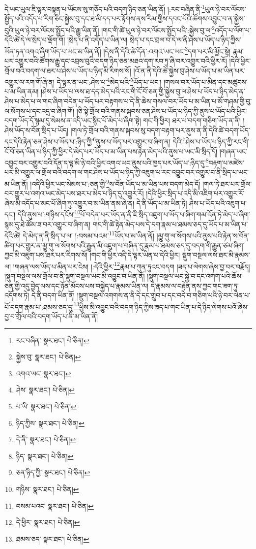 དེ་ཡང་ཡུལ་ཇི་ལྟར་བསྟན་པ་ཡོངས་སུ་གཅོད་པའི་བདག་ཉིད་ཅན་ཡིན་ནོ། །:རང་བཞིན་ནི་\footnote{རང་བཞིན་  སྣར་ཐང་།  པེ་ཅིན། }ཡུལ་ཉེ་བར་ལོངས་སྤྱོད་པའི་འདོད་པ་རིག་ཅིང་སྐྱེས་བུ་དང་ཐ་མི་དད་པར་རྟོགས་ནས་རིམ་གྱིས་དབང་པོའི་ཚོགས་འབྱུང་བ་ན་སྐྱེས་བུའི་ཡུལ་ཉེ་བར་ལོངས་སྤྱོད་པའི་རྒྱུ་ཡིན་ནོ། །གང་གི་ཚེ་ཡུལ་ཉེ་བར་ལོངས་སྤྱོད་པའི་:སྐྱེས་བུ་ལ་\footnote{སྐྱེས་བུ་  སྣར་ཐང་།  པེ་ཅིན། }འདོད་པ་ལོག་པ་དེའི་ཚེ་དེ་ལ་སྲེད་པ་ལྡོག་གོ། །སྲེད་པ་ནི་འདོད་པ་ཡིན་ལ། སྲེད་པ་དང་བྲལ་བ་དེ་ལ་ནི་ཤེས་པ་ཡོད་པ་ཉིད་ཀྱིས་ཡོན་ཏན་འགའ་ཞིག་ཡོད་པ་ཡང་མ་ཡིན་ནོ། །དེས་ནི་དེའི་ཚེ་དོན་:འགའ་ཡང་ཡང་\footnote{འགའ་ཡང་  སྣར་ཐང་། }དག་པར་མི་མྱོང་སྟེ། རྣམ་པར་འགྱུར་བའི་ཚོགས་རྒྱུ་དང་འབྲས་བུའི་བདག་ཉིད་ཅན་མཐའ་དག་རབ་ཏུ་ཞི་བར་འགྱུར་བའི་ཕྱིར་རོ། །དེའི་ཕྱིར་གྲོལ་བའི་བདག་ལ་ཐར་པ་ཤེས་པ་ཡོད་པ་ཉིད་མི་རིགས་སོ། །འོ་ན་ནི་དེའི་ཚེ་སྐྱེས་བུ་ཤེས་པ་ཡོད་པ་མ་ཡིན་པར་འགྱུར་ལ་རག་གོ་ཞེ་ན། དེ་ལྟར་ན་ཡང་:ཤེས་པ་\footnote{ཤེས་  སྣར་ཐང་།  པེ་ཅིན། }མེད་པའི་\footnote{པ་ཡི་  སྣར་ཐང་།  པེ་ཅིན། }ཡོད་པ་ཡང་། །གསལ་བར་ཡོད་པ་མིན་དང་མཚུངས་པ་མ་ཡིན་ནམ། །ཤེས་པ་ཡོད་པ་ལས་ཐ་དད་མེད་པའི་རང་གི་ངོ་བོ་ཅན་གྱི་སྐྱེས་བུ་ལ་ཤེས་པ་ཡོད་པ་ཉིད་མེད་ན་ཤེས་པ་མེད་པ་ལ་གང་ཞིག་བདེན་པ་ཡོད་པར་བརྟགས་པ་དེ་ནི་ཆེས་གསལ་བར་ཡོད་པ་མ་ཡིན་པ་མོ་གཤམ་གྱི་བུ་ལ་སོགས་པ་དང་འདྲ་བ་ཞིག་གོ། །ཅི་སྟེ་གྲོལ་བའི་གནས་སྐབས་ཅན་ཤེས་པ་ཡོད་པ་ཉིད་ཀྱི་ནུས་པ་ཡོད་པའི་ཕྱིར་བདག་ཡོད་དོ་སྙམ་དུ་སེམས་ན་འདི་ཡང་སྙིང་པོ་མེད་པ་ཞིག་སྟེ། གང་གི་ཕྱིར། ཐར་པ་བདག་གཅིག་ཡོད་ན་ནི། །ཤེས་ཡོད་ས་བོན་སྲིད་པ་ཡོད། །གལ་ཏེ་གྲོལ་བའི་གནས་སྐབས་སུ་བདག་བརྟག་པར་ནུས་ན་ནི་དེའི་ཚེ་བདག་ཡོད་དང་དེའི་རྟེན་ཅན་ཤེས་པ་ཡོད་པ་:ཉིད་ཀྱི་\footnote{ཉིད་ཀྱིས་  སྣར་ཐང་།  པེ་ཅིན། }ནུས་པ་ཡོད་པར་འགྱུར་བ་ཞིག་ན། དེའི་\footnote{དེ་ནི་  སྣར་ཐང་།  པེ་ཅིན། }ཤེས་པ་ཡོད་པ་ཉིད་ཀྱི་རང་གི་ངོ་བོ་ཅན་ཡིན་པ་ཉིད་ཀྱི་ཕྱིར་དེ་མེད་པར་ཡོད་པ་མ་ཡིན་པས་རྟེན་མེད་པའི་ནུས་པ་ཡང་མི་སྲིད་དོ། །གཞན་ཡང་འབྱུང་བར་འགྱུར་བའི་དོན་ད་ལྟ་མི་ཉེ་བའི་ཕྱིར་འགའ་ཡང་ནུས་པའི་ཁྱད་པར་ཡོད་པ་:ཉིད་དུ་\footnote{ཉིད་  སྣར་ཐང་།  པེ་ཅིན། }བརྟག་པ་མཛེས་པར་མི་འགྱུར་ལ་གྲོལ་བའི་བདག་ལ་གང་ཤེས་པ་ཡོད་པ་ཉིད་ཀྱི་འཇུག་པ་རང་འབྱུང་བར་འགྱུར་བ་ནི་སྲིད་པ་ཡང་མ་ཡིན་ནོ། །འདིའི་ཕྱིར་ཡང་སེམས་པ་:ཅན་གྱི་\footnote{ཅན་ཉིད་ཀྱི་  སྣར་ཐང་།  པེ་ཅིན། }ས་བོན་ཡོད་པ་མ་ཡིན་པས་བདག་མེད་དོ། །གལ་ཏེ་ཐར་པར་གྲོལ་བར་གྱུར་པ་འགའ་ཡང་མེད་པས་ཐར་པ་མེད་པ་ཉིད་དུ་འགྱུར་རོ། །དེའི་ཕྱིར་སྲིད་པ་འདི་མི་འཇིག་པར་འགྱུར་རོ་ཞེས་མི་འདོད་པ་མང་པོ་ཞིག་ཏུ་འགྱུར་བ་མ་ཡིན་ནམ་ཞེ་ན། དེ་ནི་ཡོད་པ་མ་ཡིན་ཏེ། ཤེས་པ་ཡོད་པའི་འཇུག་པ་དང་། དེའི་ནུས་པ་:གཉིས་དངོས་\footnote{གཉིས་  སྣར་ཐང་།  པེ་ཅིན། }པོ་བདེན་པར་ཡོད་ན་ནི་ཇི་སྲིད་འཇུག་པ་ཡོད་པ་ཞིག་གམ་འོན་ཏེ་མེད་པ་ཞིག་སྙམ་དུ་ཐེ་ཚོམ་ཟ་བར་འགྱུར་བ་ཞིག་ན། གང་གི་ཚེ་རྟེན་མེད་པས་དེ་དག་རྣམ་པ་ཐམས་ཅད་དུ་ཡོད་པ་མ་ཡིན་པ་དེའི་ཚེ། དེ་མེད་ན་ནི་སྲིད་པ་ལ། །:བསམ་པའམ་\footnote{བསམ་པའང་  སྣར་ཐང་།  པེ་ཅིན། }ཡོད་པ་མ་ཡིན་ནོ། །མྱུ་གུ་ལ་སོགས་པའི་ནུས་པའི་རྟེན་ས་བོན་ཚིག་པར་གྱུར་ན་མྱུ་གུ་ལ་སོགས་པའི་རྒྱུན་མི་འཇུག་པ་བཞིན་དུ་རྣམ་པ་ཐམས་ཅད་དུ་བདག་གི་རྒྱུན་ཙམ་ཞིག་ཀྱང་མི་འཇུག་པས་ཐར་པར་རིགས་སོ། །གང་གི་ཕྱིར་འདི་དེ་ལྟར་ཡིན་པ་དེའི་ཕྱིར། སྡུག་བསྔལ་ལས་ཐར་མི་རྣམས་ལ། །གཞན་ལས་ཡོད་པ་མིན་པར་ངེས། །:དེའི་ཕྱིར་\footnote{དེ་ཕྱིར་  སྣར་ཐང་།  པེ་ཅིན། }རྣམ་པ་ཀུན་ཏུའང་བདག །ཟད་པ་ལེགས་ཞེས་བྱ་བར་བརྗོད། །སྡུག་བསྔལ་ལས་གྲོལ་བ་ནི་སྡུག་བསྔལ་ཡང་མི་འབྱུང་བ་ཡིན་ནོ། །སྡུག་བསྔལ་ཡང་སྐྱེ་བ་དང་འགག་པའི་ཆོས་ཅན་གྱི་འདུ་བྱེད་ལས་དང་ཉོན་མོངས་པས་བསྐྱེད་པ་རྣམས་ཡིན་ལ། དེ་རྣམས་ལ་བརྟེན་ནས་ཀྱང་གང་ཟག་ཏུ་འདོགས་ཏེ། དེ་ནི་བདག་ཡིན་ནོ། །སྡུག་བསྔལ་འགགས་ན་ནི་དེ་དང་གྲུབ་པ་དང་བདེ་བ་གཅིག་པའི་ཉེ་བར་ལེན་པ་པོ་བདག་རྣམ་པ་:ཐམས་ཅད་དུ་\footnote{ཐམས་ཅད་  སྣར་ཐང་།  པེ་ཅིན། }ཕྱིས་མི་འབྱུང་བའི་བདག་ཉིད་ཀྱིས་ཟད་པ་གང་ཡིན་པ་དེ་ཉིད་ལེགས་པའོ་ཞེས་བྱ་བ་གྲོལ་བའི་བདག་ཡོད་པ་ནི་མ་ཡིན་ནོ། 